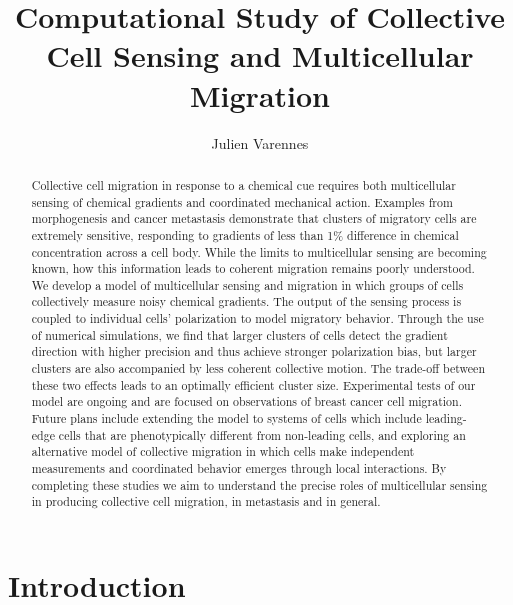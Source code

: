 \documentclass[phys,prelim]{puthesis}
\title{Computational Study of Collective Cell Sensing and Multicellular Migration}
\author{Julien Varennes}{Varennes, Julien}
\begin{document}
\volume

\tableofcontents


\begin{abstract}
    Collective cell migration in response to a chemical cue requires both multicellular sensing of chemical gradients and coordinated mechanical action. Examples from morphogenesis and cancer metastasis demonstrate that clusters of migratory cells are extremely sensitive, responding to gradients of less than 1\% difference in chemical concentration across a cell body. While the limits to multicellular sensing are becoming known, how this information leads to coherent migration remains poorly understood. We develop a model of multicellular sensing and migration in which groups of cells collectively measure noisy chemical gradients. The output of the sensing process is coupled to individual cells’ polarization to model migratory behavior. Through the use of numerical simulations, we find that larger clusters of cells detect the gradient direction with higher precision and thus achieve stronger polarization bias, but larger clusters are also accompanied by less coherent collective motion. The trade-off between these two effects leads to an optimally efficient cluster size. Experimental tests of our model are ongoing and are focused on observations of breast cancer cell migration. Future plans include extending the model to systems of cells which include leading-edge cells that are phenotypically different from non-leading cells, and exploring an alternative model of collective migration in which cells make independent measurements and coordinated behavior emerges through local interactions. By completing these studies we aim to understand the precise roles of multicellular sensing in producing collective cell migration, in metastasis and in general.
\end{abstract}


\chapter{Introduction}
\end{document}
